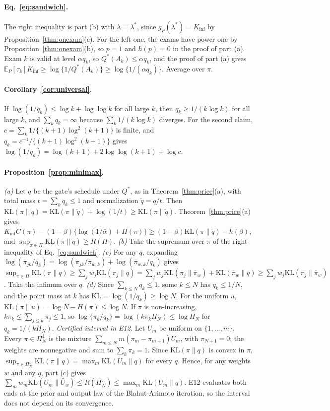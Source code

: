 \paragraph{Eq.~\eqref{eq:sandwich}.} The right inequality is part (b) with $\lambda=\lambda^*$, since $g_P(\lambda^*)=K_{\inf}$ by Proposition~\ref{thm:onexam}(c). For the left one, the exams have power one by Proposition~\ref{thm:onexam}(b), so $p=1$ and $h(p)=0$ in the proof of part (a). Exam $k$ is valid at level $\alpha q_k$, so $Q^*(A_k)\le\alpha q_k$, and the proof of part (a) gives $\mathbb E_P[\tau_k]K_{\inf}\ge\log\{1/Q^*(A_k)\}\ge\log\{1/(\alpha q_k)\}$. Average over $\pi$.

\paragraph{Corollary~\ref{cor:universal}.}
If $\log(1/q_k)\le\log k+\log\log k$ for all large $k$, then $q_k\ge1/(k\log k)$ for all large $k$, and $\sum_kq_k=\infty$ because $\sum_k1/(k\log k)$ diverges. For the second claim, $c=\sum_k1/\{(k+1)\log^2(k+1)\}$ is finite, and $q_k=c^{-1}/\{(k+1)\log^2(k+1)\}$ gives $\log(1/q_k)=\log(k+1)+2\log\log(k+1)+\log c$.

\paragraph{Proposition~\ref{prop:minimax}.}
\emph{(a)} Let $q$ be the gate's schedule under $Q^*$, as in Theorem~\ref{thm:price}(a), with total mass $t=\sum_kq_k\le1$ and normalization $\tilde q=q/t$. Then $\mathrm{KL}(\pi\|q)=\mathrm{KL}(\pi\|\tilde q)+\log(1/t)\ge\mathrm{KL}(\pi\|\tilde q)$. Theorem~\ref{thm:price}(a) gives $K_{\inf}C(\pi)-(1-\beta)\{\log(1/\bar\alpha)+H(\pi)\}\ge(1-\beta)\mathrm{KL}(\pi\|\tilde q)-h(\beta)$, and $\sup_{\pi\in\Pi}\mathrm{KL}(\pi\|\tilde q)\ge R(\Pi)$.
\emph{(b)} Take the supremum over $\pi$ of the right inequality of Eq.~\eqref{eq:sandwich}.
\emph{(c)} For any $q$, expanding $\log(\pi_{jk}/q_k)=\log(\pi_{jk}/\bar\pi_{w,k})+\log(\bar\pi_{w,k}/q_k)$ gives
$\sup_{\pi\in\Pi}\mathrm{KL}(\pi\|q)\ge\sum_jw_j\mathrm{KL}(\pi_j\|q)=\sum_jw_j\mathrm{KL}(\pi_j\|\bar\pi_w)+\mathrm{KL}(\bar\pi_w\|q)\ge\sum_jw_j\mathrm{KL}(\pi_j\|\bar\pi_w)$.
Take the infimum over $q$.
\emph{(d)} Since $\sum_{k\le N}q_k\le1$, some $k\le N$ has $q_k\le1/N$, and the point mass at $k$ has $\mathrm{KL}=\log(1/q_k)\ge\log N$. For the uniform $u$, $\mathrm{KL}(\pi\|u)=\log N-H(\pi)\le\log N$. If $\pi$ is non-increasing, $k\pi_k\le\sum_{j\le k}\pi_j\le1$, so $\log\{\pi_k/q_k\}=\log(k\pi_kH_N)\le\log H_N$ for $q_k=1/(kH_N)$.
\emph{Certified interval in E12.} Let $U_m$ be uniform on $\{1,\dots,m\}$. Every $\pi\in\Pi_N^{\downarrow}$ is the mixture $\sum_{m\le N}m(\pi_m-\pi_{m+1})U_m$, with $\pi_{N+1}=0$; the weights are nonnegative and sum to $\sum_k\pi_k=1$. Since $\mathrm{KL}(\pi\|q)$ is convex in $\pi$, $\sup_{\pi\in\Pi_N^\downarrow}\mathrm{KL}(\pi\|q)=\max_m\mathrm{KL}(U_m\|q)$ for every $q$. Hence, for any weights $w$ and any $q$, part (c) gives $\sum_mw_m\mathrm{KL}(U_m\|\bar U_w)\le R(\Pi_N^\downarrow)\le\max_m\mathrm{KL}(U_m\|q)$. E12 evaluates both ends at the prior and output law of the Blahut-Arimoto iteration, so the interval does not depend on its convergence.

